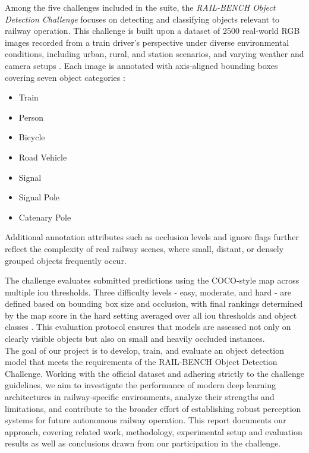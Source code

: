 Among the five challenges included in the suite, the \emph{RAIL-BENCH Object Detection Challenge} focuses on detecting and classifying objects relevant to railway operation. This challenge is built upon a dataset of 2500 real-world RGB images recorded from a train driver's perspective under diverse environmental conditions, including urban, rural, and station scenarios, and varying weather and camera setups \cite{railbench-object-detection-page}. Each image is annotated with axis-aligned bounding boxes covering seven object categories \cite{railbench-object-detection-page}:
\begin{itemize}
    \item Train
    \item Person
    \item Bicycle
    \item Road Vehicle
    \item Signal
    \item Signal Pole
    \item Catenary Pole
\end{itemize}
Additional annotation attributes such as occlusion levels and ignore flags further reflect the complexity of real railway scenes, where small, distant, or densely grouped objects frequently occur.

The challenge evaluates submitted predictions using the COCO-style \acrfull{map} across multiple \acrfull{iou} thresholds. Three difficulty levels - easy, moderate, and hard - are defined based on bounding box size and occlusion, with final rankings determined by the \acrshort{map} score in the hard setting averaged over all \acrshort{iou} thresholds and object classes \cite{railbench-object-detection-page}. This evaluation protocol ensures that models are assessed not only on clearly visible objects but also on small and heavily occluded instances.
\\

The goal of our project is to develop, train, and evaluate an object detection model that meets the requirements of the RAIL-BENCH Object Detection Challenge. Working with the official dataset and adhering strictly to the challenge guidelines, we aim to investigate the performance of modern deep learning architectures in railway-specific environments, analyze their strengths and limitations, and contribute to the broader effort of establishing robust perception systems for future autonomous railway operation. This report documents our approach, covering related work, methodology, experimental setup and evaluation results as well as conclusions drawn from our participation in the challenge.
